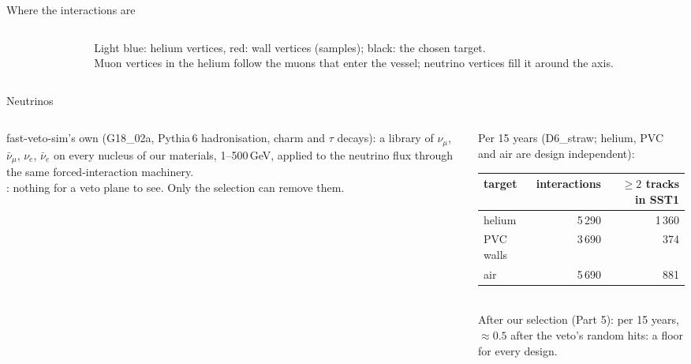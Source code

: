 \documentclass[aspectratio=169,10pt]{beamer}
\begin{document}
\begin{frame}{Where the interactions are}
  \begin{columns}[c]
    \begin{column}{0.7\textwidth}
      \\[1mm]
      \\[0.5mm]
    \end{column}
    \begin{column}{0.28\textwidth}\footnotesize
      Light blue: helium vertices, red: wall vertices (samples); black: the chosen target.\\[2mm]
      Muon vertices in the helium follow the muons that enter the vessel; neutrino vertices fill it around the axis.\\[2mm]
    \end{column}
  \end{columns}
\end{frame}

\begin{frame}{Neutrinos}
  \begin{columns}[c]
    \begin{column}{0.5\textwidth}\small
      fast-veto-sim's own  (G18\_02a, Pythia\,6 hadronisation, charm and $\tau$ decays): a library of
      $\nu_\mu$, $\bar\nu_\mu$, $\nu_e$, $\bar\nu_e$ on every nucleus of our materials, 1--500\,GeV, applied to the
      neutrino flux through the same forced-interaction machinery.\\[1.5mm]
      : nothing for a veto plane to see. Only the selection can remove them.\\[1.5mm]
    \end{column}
    \begin{column}{0.47\textwidth}\footnotesize
      Per 15 years (D6\_straw; helium, PVC and air are design independent):\\[1mm]
      \begin{tabular}{@{}lrr@{}}
        \toprule
        target & interactions & $\geq2$ tracks in SST1\\
        \midrule
        helium & 5\,290 & 1\,360\\
        PVC walls & 3\,690 & 374\\
        air & 5\,690 & 881\\
        \bottomrule
      \end{tabular}\\[1.5mm]
      After our selection (Part 5):  per 15 years, $\approx0.5$ after the veto's random hits: a floor
      for every design.
    \end{column}
  \end{columns}
\end{frame}
\end{document}
